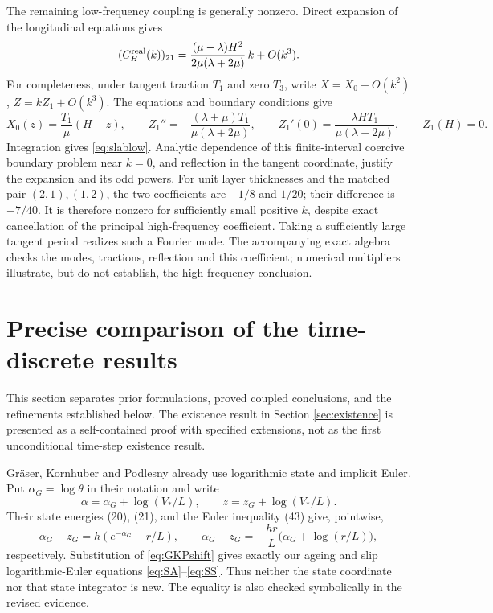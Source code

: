\documentclass[11pt,a4paper]{article}
\theoremstyle{definition}\newtheorem{definition}[theorem]{Definition}
\theoremstyle{remark}\newtheorem{remark}[theorem]{Remark}
\numberwithin{equation}{section}
\begin{document}
The remaining low-frequency coupling is generally nonzero. Direct expansion of the longitudinal equations gives
\begin{equation}\label{eq:slablow}
 (C_H^{\rm real}(k))_{21}
    =\frac{(\mu-\lambda)H^2}{2\mu(\lambda+2\mu)}\,k+O(k^3).
\end{equation}
For completeness, under tangent traction $T_1$ and zero $T_3$, write $X=X_0+O(k^2)$, $Z=kZ_1+O(k^3)$. The equations and boundary conditions give
\[
 X_0(z)=\frac{T_1}{\mu}(H-z),\qquad
 Z_1''=-\frac{(\lambda+\mu)T_1}{\mu(\lambda+2\mu)},\qquad
 Z_1'(0)=\frac{\lambda H T_1}{\mu(\lambda+2\mu)},\qquad Z_1(H)=0.
\]
Integration gives \eqref{eq:slablow}. Analytic dependence of this finite-interval coercive boundary problem near $k=0$, and reflection in the tangent coordinate, justify the expansion and its odd powers. For unit layer thicknesses and the matched pair $(2,1),(1,2)$, the two coefficients are $-1/8$ and $1/20$; their difference is $-7/40$. It is therefore nonzero for sufficiently small positive $k$, despite exact cancellation of the principal high-frequency coefficient. Taking a sufficiently large tangent period realizes such a Fourier mode. The accompanying exact algebra checks the modes, tractions, reflection and this coefficient; numerical multipliers illustrate, but do not establish, the high-frequency conclusion.

\section{Precise comparison of the time-discrete results}\label{sec:priorart}
This section separates prior formulations, proved coupled conclusions, and the refinements established below. The existence result in Section \ref{sec:existence} is presented as a self-contained proof with specified extensions, not as the first unconditional time-step existence result.

Gr\"aser, Kornhuber and Podlesny \cite{GKP} already use logarithmic state and implicit Euler. Put $\alpha_G=\log\theta$ in their notation and write
\begin{equation}\label{eq:GKPshift}
 \alpha=\alpha_G+\log(V_*/L),\qquad
 z=z_G+\log(V_*/L).
\end{equation}
Their state energies (20), (21), and the Euler inequality (43) give, pointwise,
\[
 \alpha_G-z_G=h(e^{-\alpha_G}-r/L),\qquad
 \alpha_G-z_G=-\frac{hr}{L}\bigl(\alpha_G+\log(r/L)\bigr),
\]
respectively. Substitution of \eqref{eq:GKPshift} gives exactly our ageing and slip logarithmic-Euler equations \eqref{eq:SA}--\eqref{eq:SS}. Thus neither the state coordinate nor that state integrator is new. The equality is also checked symbolically in the revised evidence.
\end{document}

